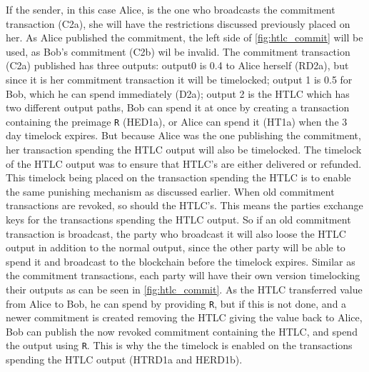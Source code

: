 If the sender, in this case Alice, is the one who broadcasts the commitment transaction (C2a), she will have the restrictions discussed previously placed on her.
As Alice published the commitment, the left side of \cref{fig:htlc_commit} will be used, as Bob's commitment (C2b) wil be invalid. The commitment transaction (C2a) published has three outputs: output0 is 0.4 to Alice herself (RD2a), but since it is her commitment transaction it will be timelocked; output 1 is 0.5 for Bob, which he can spend immediately (D2a); output 2 is the HTLC which has two different output paths, Bob can spend it at once by creating a transaction containing the preimage {\tt R} (HED1a), or Alice can spend it (HT1a) when the 3 day timelock expires. But because Alice was the one publishing the commitment, her transaction spending the HTLC output will also be timelocked. The timelock of the HTLC output was to ensure that HTLC's are either delivered or refunded. This timelock being placed on the transaction spending the HTLC is to enable the same punishing mechanism as discussed earlier. When old commitment transactions are revoked, so should the HTLC's. This means the parties exchange keys for the transactions spending the HTLC output. 
So if an old commitment transaction is broadcast, the party who broadcast it will also loose the HTLC output in addition to the normal output, since the other party will be able to spend it and broadcast to the blockchain before the timelock expires. Similar as the commitment transactions, each party will have their own version timelocking their outputs as can be seen in \cref{fig:htlc_commit}. As the HTLC transferred value from Alice to Bob, he can spend by providing {\tt R}, but if this is not done, and a newer commitment is created removing the HTLC giving the value back to Alice, Bob can publish the now revoked commitment containing the HTLC, and spend the output using {\tt R}. This is why the the timelock is enabled on the transactions spending the HTLC output (HTRD1a and HERD1b). 
\\ 

